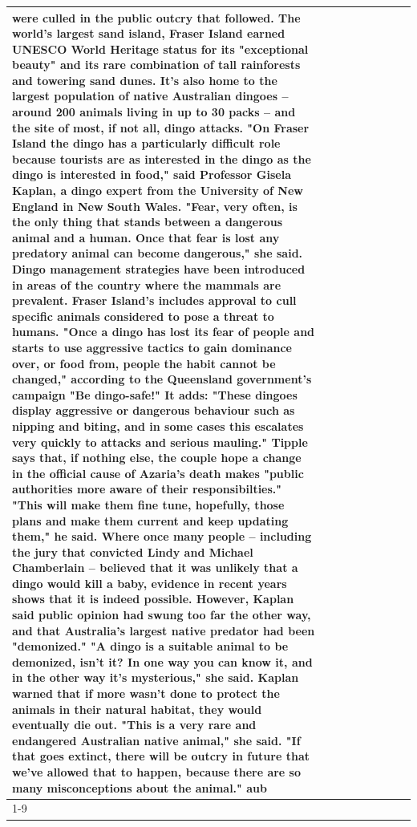 \begin{table}[H]
\begin{tabular}{lllrlllll}
were culled in the public outcry that followed. The world's largest sand island, Fraser Island earned UNESCO World Heritage status for its "exceptional beauty" and its rare combination of tall rainforests and towering sand dunes. It's also home to the largest population of native Australian dingoes -- around 200 animals living in up to 30 packs -- and the site of most, if not all, dingo attacks. "On Fraser Island the dingo has a particularly difficult role because tourists are as interested in the dingo as the dingo is interested in food," said Professor Gisela Kaplan, a dingo expert from the University of New England in New South Wales. "Fear, very often, is the only thing that stands between a dangerous animal and a human. Once that fear is lost any predatory animal can become dangerous," she said. Dingo management strategies have been introduced in areas of the country where the mammals are prevalent. Fraser Island's includes approval to cull specific animals considered to pose a threat to humans. "Once a dingo has lost its fear of people and starts to use aggressive tactics to gain dominance over, or food from, people the habit cannot be changed," according to the Queensland government's campaign "Be dingo-safe!" It adds: "These dingoes display aggressive or dangerous behaviour such as nipping and biting, and in some cases this escalates very quickly to attacks and serious mauling." Tipple says that, if nothing else, the couple hope a change in the official cause of Azaria's death makes "public authorities more aware of their responsibilties." "This will make them fine tune, hopefully, those plans and make them current and keep updating them," he said. Where once many people -- including the jury that convicted Lindy and Michael Chamberlain -- believed that it was unlikely that a dingo would kill a baby, evidence in recent years shows that it is indeed possible. However, Kaplan said public opinion had swung too far the other way, and that Australia's largest native predator had been "demonized." "A dingo is a suitable animal to be demonized, isn't it? In one way you can know it, and in the other way it's mysterious," she said. Kaplan warned that if more wasn't done to protect the animals in their natural habitat, they would eventually die out. "This is a very rare and endangered Australian native animal," she said. "If that goes extinct, there will be outcry in future that we've allowed that to happen, because there are so many misconceptions about the animal." aub \\
\cline{1-9}

\end{tabular}
\end{table}
